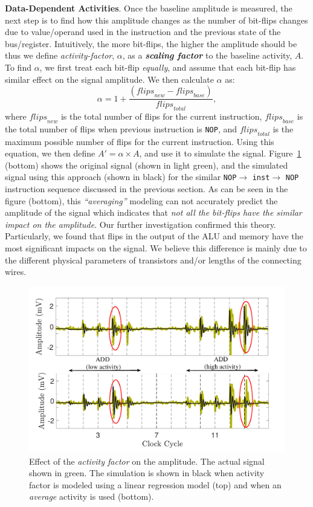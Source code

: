 \documentclass[11 pt]{article}
\begin{document}
\noindent \textbf{Data-Dependent Activities}. Once the baseline amplitude is measured, the next step is to find how this amplitude changes as the number of bit-flips changes due to value/operand used in the instruction and the previous state of the bus/register. Intuitively, the more bit-flips, the higher the amplitude should be thus we define \textit{activity-factor}, $\alpha$, as a \textbf{\textit{scaling factor}} to the baseline activity, $A$.
To find $\alpha$, we first treat each bit-flip \textit{equally}, and assume that each bit-flip has similar effect on the signal amplitude. We then calculate $\alpha$ as:
\begin{equation}
\alpha = 1 + \frac{(\mathit{flips}_{new} - \mathit{flips}_{base})}{\mathit{flips}_{total}},
\end{equation}
where $\mathit{flips}_{new}$ is the total number of flips for the current instruction,  $\mathit{flips}_{base}$ is the total number of flips when previous instruction is {\tt NOP}, and $\mathit{flips}_{total}$ is the maximum possible number of flips for the current instruction. Using this equation, we then define $A' = \alpha\times A$, and use it to simulate the signal. Figure~\ref{fig:alpha} (bottom) shows the original signal (shown in light green), and the simulated signal using this approach (shown in black) for the similar {\tt NOP}$\rightarrow$ {\tt inst}$\rightarrow$ {\tt NOP} instruction sequence discussed in the previous section. As can be seen in the figure (bottom), this \textit{``averaging''} modeling can not accurately predict the amplitude of the signal which indicates that \emph{not all the bit-flips have the similar impact on the amplitude}. Our further investigation confirmed this theory. Particularly, we found that flips in the output of the ALU and memory have the most significant impacts on the signal. We believe this difference is mainly due to the different physical parameters of transistors and/or lengths of the connecting wires.
\begin{figure}
	\centering
	\includegraphics[width=0.4\columnwidth]{figure/alpha2.pdf}
	\caption{Effect of the \textit{activity factor} on the amplitude. The actual signal shown in green. The simulation is shown in black when activity factor is modeled using a linear regression model (top) and when an \textit{average} activity is used (bottom).}
	\label{fig:alpha}
\end{figure}
\end{document}

